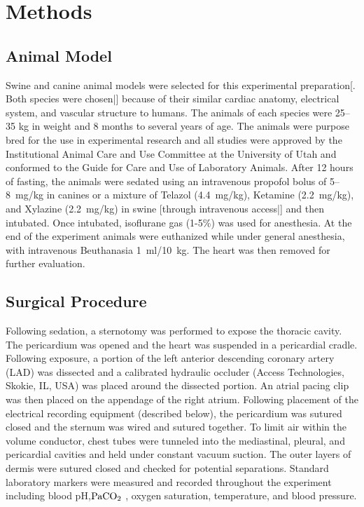 \documentclass[twocolumn]{cinc}
\begin{document}
%


\section{Methods}

\subsection{Animal Model} 

Swine and canine animal models were selected for this experimental
preparation[. Both species were chosen|] because of their similar cardiac
anatomy, electrical system, and vascular structure to humans. The animals
of each species were 25--35 kg in weight and 8 months to
several years of age. The animals were purpose bred for the use
in experimental research and all studies were approved by the
Institutional Animal Care and Use Committee at the University of Utah and
conformed to the Guide for Care and Use of Laboratory Animals. After 12
hours of fasting, the animals were sedated using an intravenous propofol
bolus of 5--8~mg/kg in canines or a mixture of Telazol
(4.4~mg/kg), Ketamine (2.2~mg/kg), and Xylazine (2.2~mg/kg) in swine
[through intravenous access|] and then intubated. Once intubated,
isoflurane gas (1-5\%) was used for anesthesia. At the end of the
experiment animals were euthanized while under general anesthesia, with
intravenous Beuthanasia 1~ml/10~kg. The heart was then removed for further
evaluation.

\subsection{Surgical Procedure}

Following sedation, a sternotomy was performed to expose the thoracic
cavity. The pericardium was opened and the heart was suspended in a
pericardial cradle. Following exposure, a portion of the left anterior
descending coronary artery (LAD) was dissected and a calibrated hydraulic
occluder (Access Technologies, Skokie, IL, USA) was placed around the
dissected portion. An atrial pacing clip was then
placed on the appendage of the right atrium. Following placement of
the electrical recording equipment (described below), the pericardium was
sutured closed and the sternum was wired and sutured together. To limit air
within the volume conductor, chest tubes were tunneled into the
mediastinal, pleural, and pericardial cavities and held under constant
vacuum suction. The outer layers of dermis were sutured closed and checked
for potential separations. Standard laboratory markers were measured and
recorded throughout the experiment including blood pH,${\rm PaCO_2}$ , oxygen saturation,
temperature, and blood pressure.
\end{document}
